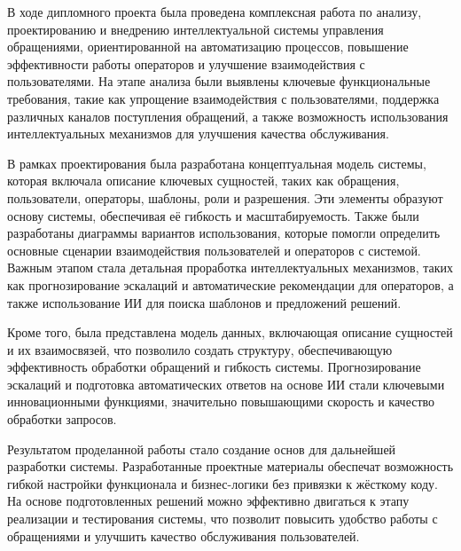 
В ходе дипломного проекта была проведена комплексная работа по анализу, проектированию и внедрению интеллектуальной системы управления обращениями, ориентированной на автоматизацию процессов, повышение эффективности работы операторов и улучшение взаимодействия с пользователями. На этапе анализа были выявлены ключевые функциональные требования, такие как упрощение взаимодействия с пользователями, поддержка различных каналов поступления обращений, а также возможность использования интеллектуальных механизмов для улучшения качества обслуживания.

В рамках проектирования была разработана концептуальная модель системы, которая включала описание ключевых сущностей, таких как обращения, пользователи, операторы, шаблоны, роли и разрешения. Эти элементы образуют основу системы, обеспечивая её гибкость и масштабируемость. Также были разработаны диаграммы вариантов использования, которые помогли определить основные сценарии взаимодействия пользователей и операторов с системой. Важным этапом стала детальная проработка интеллектуальных механизмов, таких как прогнозирование эскалаций и автоматические рекомендации для операторов, а также использование ИИ для поиска шаблонов и предложений решений.

Кроме того, была представлена модель данных, включающая описание сущностей и их взаимосвязей, что позволило создать структуру, обеспечивающую эффективность обработки обращений и гибкость системы. Прогнозирование эскалаций и подготовка автоматических ответов на основе ИИ стали ключевыми инновационными функциями, значительно повышающими скорость и качество обработки запросов.

Результатом проделанной работы стало создание основ для дальнейшей разработки системы. Разработанные проектные материалы обеспечат возможность гибкой настройки функционала и бизнес-логики без привязки к жёсткому коду. На основе подготовленных решений можно эффективно двигаться к этапу реализации и тестирования системы, что позволит повысить удобство работы с обращениями и улучшить качество обслуживания пользователей.